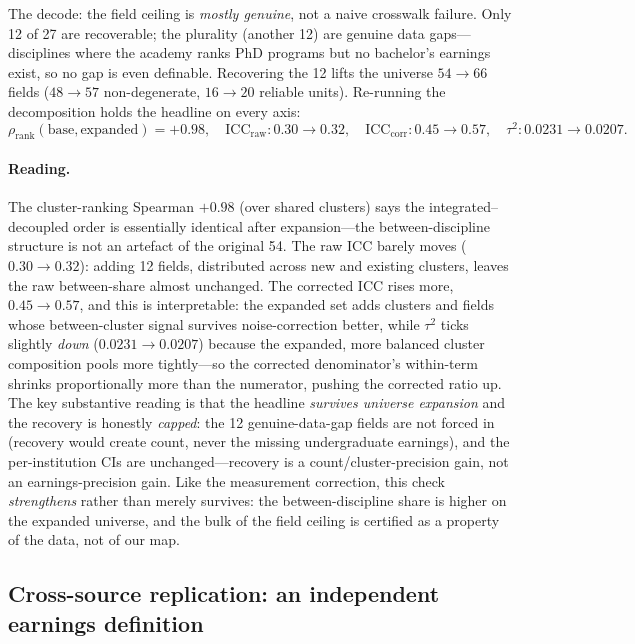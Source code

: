 \documentclass[11pt]{article}
\begin{document}
The decode: the field ceiling is \emph{mostly genuine}, not a naive crosswalk failure. Only 12 of 27 are recoverable; the plurality (another 12) are genuine data gaps---disciplines where the academy ranks PhD programs but no bachelor's earnings exist, so no gap is even definable. Recovering the 12 lifts the universe $54\to66$ fields ($48\to57$ non-degenerate, $16\to20$ reliable units). Re-running the decomposition holds the headline on every axis:
\[
\rho_{\text{rank}}(\text{base},\text{expanded}) = +0.98, \quad
\mathrm{ICC}_{\text{raw}}: 0.30 \to 0.32, \quad
\mathrm{ICC}_{\text{corr}}: 0.45 \to 0.57, \quad
\tau^2: 0.0231 \to 0.0207 .
\]

\paragraph{Reading.} The cluster-ranking Spearman $+0.98$ (over shared clusters) says the integrated--decoupled order is essentially identical after expansion---the between-discipline structure is not an artefact of the original 54. The raw ICC barely moves ($0.30\to0.32$): adding 12 fields, distributed across new and existing clusters, leaves the raw between-share almost unchanged. The corrected ICC rises more, $0.45\to0.57$, and this is interpretable: the expanded set adds clusters and fields whose between-cluster signal survives noise-correction better, while $\tau^2$ ticks slightly \emph{down} ($0.0231\to0.0207$) because the expanded, more balanced cluster composition pools more tightly---so the corrected denominator's within-term shrinks proportionally more than the numerator, pushing the corrected ratio up. The key substantive reading is that the headline \emph{survives universe expansion} and the recovery is honestly \emph{capped}: the 12 genuine-data-gap fields are not forced in (recovery would create count, never the missing undergraduate earnings), and the per-institution CIs are unchanged---recovery is a count/cluster-precision gain, not an earnings-precision gain. Like the measurement correction, this check \emph{strengthens} rather than merely survives: the between-discipline share is higher on the expanded universe, and the bulk of the field ceiling is certified as a property of the data, not of our map.

\subsection{Cross-source replication: an independent earnings definition}
\end{document}
